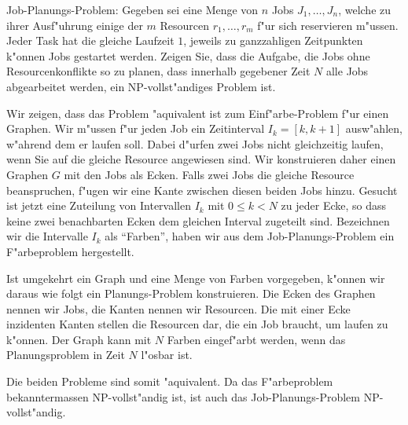 Job-Planungs-Problem:
Gegeben sei eine Menge von $n$ Jobs $J_1,\dots,J_n$, welche zu ihrer
Ausf"uhrung einige der $m$ Resourcen $r_1,\dots,r_m$ f"ur sich reservieren
m"ussen. Jeder Task hat die gleiche Laufzeit $1$, jeweils zu ganzzahligen
Zeitpunkten k"onnen Jobs gestartet werden. Zeigen Sie, dass die
Aufgabe, die Jobs ohne Resourcenkonflikte so zu planen, dass innerhalb
gegebener Zeit $N$ alle Jobs abgearbeitet werden, ein NP-vollst"andiges Problem
ist.

\begin{loesung}
Wir zeigen, dass das Problem "aquivalent ist zum Einf"arbe-Problem f"ur
einen Graphen. Wir m"ussen f"ur jeden Job ein Zeitinterval $I_k=[k,k+1]$
ausw"ahlen, w"ahrend dem er laufen soll. Dabei d"urfen zwei Jobs nicht
gleichzeitig laufen, wenn Sie auf die gleiche Resource angewiesen sind.
Wir konstruieren daher einen Graphen $G$ mit den Jobs als Ecken. Falls
zwei Jobs die gleiche Resource beanspruchen, f"ugen wir eine Kante
zwischen diesen beiden Jobs hinzu. Gesucht ist jetzt eine Zuteilung
von Intervallen $I_k$ mit $0\le k< N$ zu jeder Ecke, so dass keine
zwei benachbarten Ecken dem gleichen Interval zugeteilt sind. Bezeichnen
wir die Intervalle $I_k$ als ``Farben'', haben wir aus dem Job-Planungs-Problem
ein F"arbeproblem hergestellt.

Ist umgekehrt ein Graph und eine Menge von Farben vorgegeben, k"onnen
wir daraus wie folgt ein Planungs-Problem konstruieren. Die Ecken
des Graphen nennen wir Jobs, die Kanten nennen wir Resourcen. Die
mit einer Ecke inzidenten Kanten stellen die Resourcen dar, die ein
Job braucht, um laufen zu k"onnen. Der Graph kann mit $N$ Farben
eingef"arbt werden, wenn das Planungsproblem in Zeit $N$ l"osbar ist.

Die beiden Probleme sind somit "aquivalent. Da das F"arbeproblem
bekanntermassen NP-vollst"andig ist, ist auch das Job-Planungs-Problem
NP-vollst"andig.
\end{loesung}
